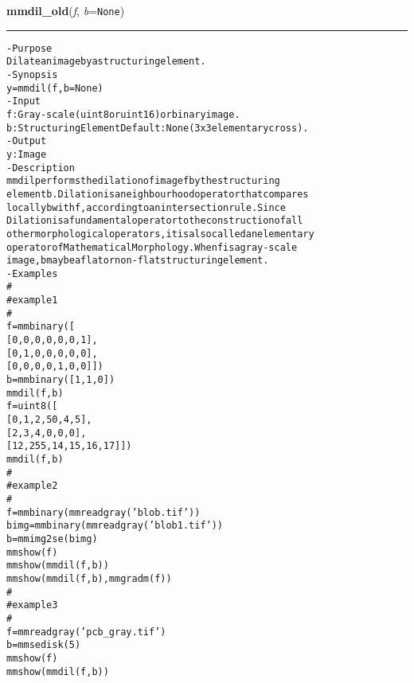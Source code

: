     \begin{boxedminipage}{\textwidth}

    \raggedright \textbf{mmdil\_old}(\textit{f}, \textit{b}=\texttt{N\-o\-n\-e\-})

    \vspace{-1.5ex}

    \rule{\textwidth}{0.5\fboxrule}
\begin{alltt}
- Purpose
    Dilate an image by a structuring element.
- Synopsis
    y = mmdil(f, b=None)
- Input
    f: Gray-scale (uint8 or uint16) or binary image.
    b: Structuring Element Default: None (3x3 elementary cross).
- Output
    y: Image
- Description
    mmdil performs the dilation of image f by the structuring
    element b . Dilation is a neighbourhood operator that compares
    locally b with f , according to an intersection rule. Since
    Dilation is a fundamental operator to the construction of all
    other morphological operators, it is also called an elementary
    operator of Mathematical Morphology. When f is a gray-scale
    image, b may be a flat or non-flat structuring element.
- Examples
    \#
    \#   example 1
    \#
    f=mmbinary([
       [0, 0, 0, 0, 0, 0, 1],
       [0, 1, 0, 0, 0, 0, 0],
       [0, 0, 0, 0, 1, 0, 0]])
    b=mmbinary([1, 1, 0])
    mmdil(f,b)
    f=uint8([
       [ 0,   1,  2, 50,  4,  5],
       [ 2,   3,  4,  0,  0,  0],
       [12, 255, 14, 15, 16, 17]])
    mmdil(f,b)
    \#
    \#   example 2
    \#
    f=mmbinary(mmreadgray('blob.tif'))
    bimg=mmbinary(mmreadgray('blob1.tif'))
    b=mmimg2se(bimg)
    mmshow(f)
    mmshow(mmdil(f,b))
    mmshow(mmdil(f,b),mmgradm(f))
    \#
    \#   example 3
    \#
    f=mmreadgray('pcb\_gray.tif')
    b=mmsedisk(5)
    mmshow(f)
    mmshow(mmdil(f,b))\end{alltt}

    \vspace{1ex}

    \end{boxedminipage}

    \label{multireg:num_pymorph:mmdist}
    \vspace{0.5ex}

